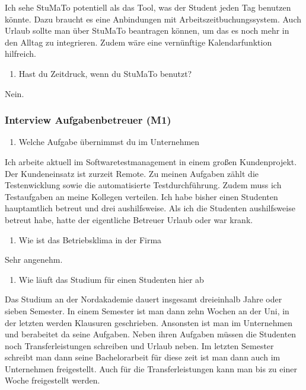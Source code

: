 \documentclass[
  12pt,
  ngerman,
  a4paper,
]{article}
\providecommand{\tightlist}{%
  \setlength{\itemsep}{0pt}\setlength{\parskip}{0pt}}
\begin{document}
Ich sehe StuMaTo potentiell als das Tool, was der Student jeden Tag
benutzen könnte. Dazu braucht es eine Anbindungen mit
Arbeitszeitbuchungssystem. Auch Urlaub sollte man über StuMaTo
beantragen können, um das es noch mehr in den Alltag zu integrieren.
Zudem wäre eine vernünftige Kalendarfunktion hilfreich.

\begin{enumerate}
\def\labelenumi{\arabic{enumi}.}
\setcounter{enumi}{16}
\tightlist
\item
  Hast du Zeitdruck, wenn du StuMaTo benutzt?
\end{enumerate}

Nein.

\hypertarget{interview-aufgabenbetreuer-m1}{%
\subsubsection{Interview Aufgabenbetreuer
(M1)}\label{interview-aufgabenbetreuer-m1}}

\begin{enumerate}
\def\labelenumi{\arabic{enumi}.}
\tightlist
\item
  Welche Aufgabe übernimmst du im Unternehmen
\end{enumerate}

Ich arbeite aktuell im Softwaretestmanagement in einem großen
Kundenprojekt. Der Kundeneinsatz ist zurzeit Remote. Zu meinen Aufgaben
zählt die Testenwicklung sowie die automatisierte Testdurchführung.
Zudem muss ich Testaufgaben an meine Kollegen verteilen. Ich habe bisher
einen Studenten hauptamtlich betreut und drei aushilfsweise. Als ich die
Studenten aushilfsweise betreut habe, hatte der eigentliche Betreuer
Urlaub oder war krank.

\begin{enumerate}
\def\labelenumi{\arabic{enumi}.}
\setcounter{enumi}{1}
\tightlist
\item
  Wie ist das Betriebsklima in der Firma
\end{enumerate}

Sehr angenehm.

\begin{enumerate}
\def\labelenumi{\arabic{enumi}.}
\setcounter{enumi}{2}
\tightlist
\item
  Wie läuft das Studium für einen Studenten hier ab
\end{enumerate}

Das Studium an der Nordakademie dauert insgesamt dreieinhalb Jahre oder
sieben Semester. In einem Semester ist man dann zehn Wochen an der Uni,
in der letzten werden Klausuren geschrieben. Ansonsten ist man im
Unternehmen und berabeitet da seine Aufgaben. Neben ihren Aufgaben
müssen die Studenten noch Transferleistungen schreiben und Urlaub neben.
Im letzten Semester schreibt man dann seine Bachelorarbeit für diese
zeit ist man dann auch im Unternehmen freigestellt. Auch für die
Transferleistungen kann man bis zu einer Woche freigestellt werden.
\end{document}
